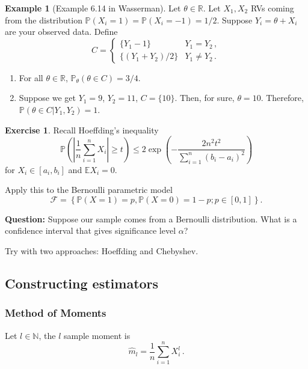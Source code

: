 \documentclass[
  openany]{book}
\theoremstyle{definition}
\theoremstyle{definition}
\newtheorem{example}{Example}[chapter]
\theoremstyle{definition}
\newtheorem{exercise}{Exercise}[chapter]
\theoremstyle{definition}
\theoremstyle{remark}
\begin{document}
\begin{example}[Example 6.14 in Wasserman]

Let \(\theta \in \mathbb{R}\). Let \(X_1, X_2\) RVs coming from the distribution
\(\mathbb{P}(X_i = 1) = \mathbb{P}(X_i = -1) = 1/2\).
Suppose \(Y_i = \theta + X_i\) are your observed data.
Define
\[ C = \begin{cases}
    \{ Y_1 - 1\} & Y_1 = Y_2 \,, \\
    \{ (Y_1 + Y_2)/2 \} & Y_1 \not= Y_2 \,.
\end{cases}\]

\begin{enumerate}
\def\labelenumi{\arabic{enumi}.}
\item
  For all \(\theta\in \mathbb{R}\), \(\mathbb{P}_\theta(\theta \in C ) = 3/4\).
\item
  Suppose we get \(Y_1 = 9\), \(Y_2 = 11\), \(C = \{ 10 \}\). Then, for sure, \(\theta = 10\).
  Therefore,
  \(\mathbb{P}(\theta \in C | Y_1, Y_2) = 1\).
\end{enumerate}

\end{example}

\begin{exercise}
Recall Hoeffding's inequality
\[ \mathbb{P}\left( \left| \frac{1}{n}\sum_{i=1}^n X_i \right| \geq t \right) 
\leq 2  \exp\left( - \frac{2 n^2 t^2}{\sum_{i=1}^n (b_i - a_i)^2}   \right) \]
for \(X_i \in [a_i, b_i]\) and \(\mathbb{E}X_i = 0\).

Apply this to the Bernoulli parametric model
\[\mathcal{F} = \left\{ \mathbb{P}(X= 1) = p, \mathbb{P}(X = 0) = 1-p; p \in [0,1]   \right\}.\]

\textbf{Question:} Suppose our sample comes from a Bernoulli distribution.
What is a confidence interval that gives significance level \(\alpha\)?

Try with two approaches: Hoeffding and Chebyshev.
\end{exercise}

\subsection{Constructing estimators}\label{constructing-estimators}

\subsubsection{Method of Moments}\label{method-of-moments}

Let \(l \in \mathbb{N}\), the \(l\) sample moment is
\[
   \hat m_l = \frac 1 n \sum_{i=1}^n X_i^l \,.
\]
\end{document}

